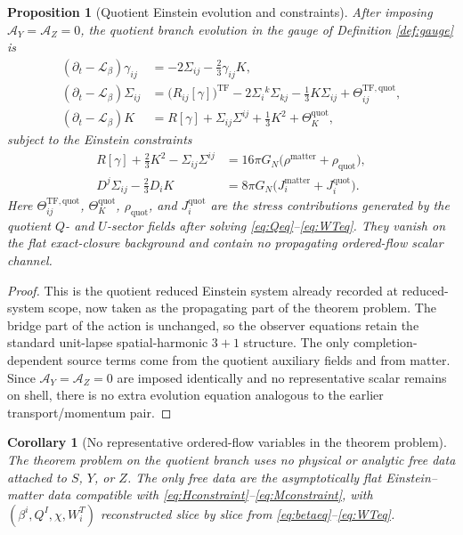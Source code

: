 \documentclass[11pt]{article}
\newcommand{\Ell}{\mathcal{L}}
\newcommand{\AY}{\mathcal A_Y}
\newcommand{\AZ}{\mathcal A_Z}
\newtheorem{proposition}{Proposition}
\newtheorem{corollary}{Corollary}
\begin{document}
\begin{proposition}[Quotient Einstein evolution and constraints]
\label{prop:reduced}
After imposing \(\AY=\AZ=0\), the quotient branch evolution in the gauge of Definition \ref{def:gauge} is
\begin{align}
(\partial_t-\Ell_\beta)\gamma_{ij}
&=
-2\Sigma_{ij}-\frac23\gamma_{ij}K,
\label{eq:gammadt}
\\
(\partial_t-\Ell_\beta)\Sigma_{ij}
&=
\bigl(R_{ij}[\gamma]\bigr)^{\mathrm{TF}}
-2\Sigma_i{}^k\Sigma_{kj}
-\frac13K\Sigma_{ij}
+\Theta_{ij}^{\mathrm{TF,quot}},
\label{eq:Sigmadt}
\\
(\partial_t-\Ell_\beta)K
&=
R[\gamma]+\Sigma_{ij}\Sigma^{ij}+\frac13K^2+\Theta_K^{\mathrm{quot}},
\label{eq:Kdt}
\end{align}
subject to the Einstein constraints
\begin{align}
R[\gamma]+\frac23K^2-\Sigma_{ij}\Sigma^{ij}
&=
16\pi G_N\bigl(\rho^{\mathrm{matter}}+\rho_{\mathrm{quot}}\bigr),
\label{eq:Hconstraint}
\\
D^j\Sigma_{ij}-\frac23D_iK
&=
8\pi G_N\bigl(J_i^{\mathrm{matter}}+J_i^{\mathrm{quot}}\bigr).
\label{eq:Mconstraint}
\end{align}
Here \(\Theta_{ij}^{\mathrm{TF,quot}}\), \(\Theta_K^{\mathrm{quot}}\), \(\rho_{\mathrm{quot}}\), and \(J_i^{\mathrm{quot}}\) are the stress contributions generated by the quotient \(Q\)- and \(U\)-sector fields after solving \eqref{eq:Qeq}--\eqref{eq:WTeq}. They vanish on the flat exact-closure background and contain no propagating ordered-flow scalar channel.
\end{proposition}

\begin{proof}
This is the quotient reduced Einstein system already recorded at reduced-system scope, now taken as the propagating part of the theorem problem. The bridge part of the action is unchanged, so the observer equations retain the standard unit-lapse spatial-harmonic \(3+1\) structure. The only completion-dependent source terms come from the quotient auxiliary fields and from matter. Since \(\AY=\AZ=0\) are imposed identically and no representative scalar remains on shell, there is no extra evolution equation analogous to the earlier transport/momentum pair.
\end{proof}

\begin{corollary}[No representative ordered-flow variables in the theorem problem]
\label{cor:norep}
The theorem problem on the quotient branch uses no physical or analytic free data attached to \(S\), \(Y\), or \(Z\). The only free data are the asymptotically flat Einstein--matter data compatible with \eqref{eq:Hconstraint}--\eqref{eq:Mconstraint}, with \((\beta^i,Q^I,\chi,W_i^T)\) reconstructed slice by slice from \eqref{eq:betaeq}--\eqref{eq:WTeq}.
\end{corollary}
\end{document}
